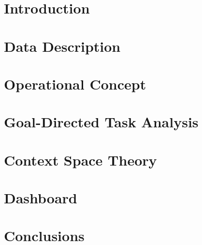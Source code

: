 \documentclass[11pt]{report}
\begin{document}


\tableofcontents

\chapter[Introduction]{Introduction}\label{ch:introduction}


\chapter[Data Description]{Data Description}\label{ch:data-description}


\chapter[Operational Concept]{Operational Concept}\label{ch:operationalconcept}


\chapter[Goal-Directed Task Analysis]{Goal-Directed Task Analysis}\label{ch:gdta}


\chapter[Context Space Theory]{Context Space Theory}\label{ch:cst}


\chapter[Dashboard]{Dashboard}\label{ch:dashboard}


\chapter[Conclusions]{Conclusions}\label{ch:conclusions}



\setcounter{page}{1}


\listoffigures
\listoftables
\end{document}

